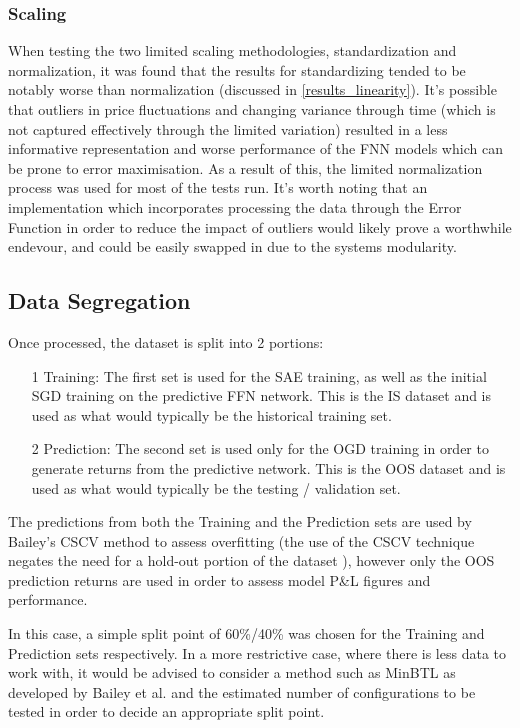 \documentclass[a4paper,11pt,oneside]{article}
\theoremstyle{plain}
\theoremstyle{definition}
\begin{document}
	
	
	\subsubsection {Scaling} When testing the two limited scaling methodologies, standardization and normalization, it was found that the results for standardizing tended to be notably worse than normalization (discussed in \ref{results_linearity}). It's possible that outliers in price fluctuations and changing variance through time (which is not captured effectively through the limited variation) resulted in a less informative representation and worse performance of the FNN models which can be prone to error maximisation. As a result of this, the limited normalization process was used for most of the tests run. It's worth noting that an implementation which incorporates processing the data through the Error Function in order to reduce the impact of outliers would likely prove a worthwhile endevour, and could be easily swapped in due to the systems modularity.\newline
	
	
	\subsection{Data Segregation}\label{proc_dataseg}
	
	Once processed, the dataset is split into 2 portions: 
	\begin{itemize}
		\item[1] Training: The first set is used for the SAE training, as well as the initial SGD training on the predictive FFN network. This is the IS dataset and is used as what would typically be the historical training set.
		\item[2] Prediction: The second set is used only for the OGD training in order to generate returns from the predictive network. This is the OOS dataset and is used as what would typically be the testing / validation set.
	\end{itemize}
	
	The predictions from both the Training and the Prediction sets are used by Bailey's CSCV method to assess overfitting (the use of the CSCV technique negates the need for a hold-out portion of the dataset \cite{BailyPBO}), however only the OOS prediction returns are used in order to assess model P\&L figures and performance. \newline
	
	In this case, a simple split point of 60\%/40\% was chosen for the Training and Prediction sets respectively. In a more restrictive case, where there is less data to work with, it would be advised to consider a method such as MinBTL as developed by Bailey et al. \cite{BaileyBTL} and the estimated number of configurations to be tested in order to decide an appropriate split point.
	
\end{document}

